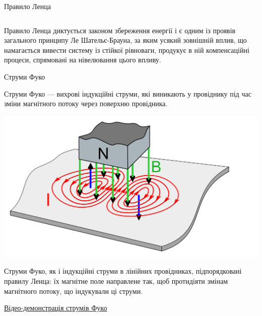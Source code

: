\documentclass[onlytextwidth]{beamer}
\begin{document}
\begin{frame}{Правило Ленца}{}
\begin{columns}
\begin{column}{0.5\linewidth}
		\end{column}
	\end{columns}
	\begin{block}{}\justifying\small
		Правило Ленца диктується законом збереження енергії і є одним із проявів загального принципу Ле Шательє-Брауна, за яким \alert{усякий зовнішній
			вплив, що намагається вивести систему із стійкої рівноваги, продукує в ній компенсаційні процеси, спрямовані на нівелювання цього впливу}.
	\end{block}
\end{frame}

\begin{frame}{Струми Фуко}{}
	\begin{block}{}\justifying
		Струми Фуко --- вихрові індукційні струми, які виникають у провіднику під час зміни магнітного потоку через поверхню провідника.
	\end{block}
	\begin{center}
		\includegraphics[width=.5\linewidth]{Fuko_currents}
	\end{center}

	\begin{block}{}\justifying
		Струми Фуко, як і індукційні струми в лінійних провідниках, підпорядковані правилу Ленца: їх магнітне поле направлене так, щоб протидіяти змінам
		магнітного потоку, що індукували ці струми.
	\end{block}
	\begin{block}{}
		\href{https://youtu.be/MglUIiBy2lQ}{\color{blue}Відео-демонстрація струмів Фуко}
	\end{block}
\end{frame}
\end{document}
